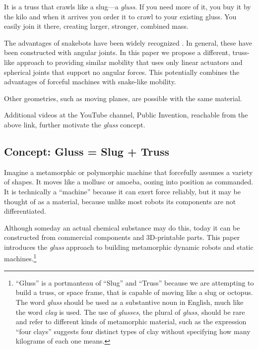 \documentclass[11pt]{article}
\begin{document}
It is a truss that crawls like a slug---a \emph{gluss}.
If you need more of it, you buy it by the kilo and when it arrives you order it
to crawl to your existing gluss. You easily join it there, creating 
larger, stronger, combined mass.

The advantages of snakebots have been widely recognized \cite{liljebäck2012snake}. In general, these have been constructed
with angular joints. In this paper we propose a different, truss-like approach to providing similar
mobility that uses only linear actuators and spherical joints that support no angular forces. This
potentially combines the advantages of forceful machines with snake-like mobility.

Other geometries, such as moving planes, are possible with the same material.

Additional videos at the YouTube channel, Public Invention, reachable from the above link,
further motivate the \emph{gluss} concept.


\subsection{Concept: Gluss = Slug + Truss}

Imagine a metamorphic or polymorphic machine that forcefully assumes a variety of shapes. It moves like a mollusc or amoeba,
oozing into position as commanded. It is technically a ``machine'' because it can exert force reliably, but
it may be thought of as a material, because unlike most robots its components are not differentiated.

Although someday an actual chemical substance may do this, today it can be constructed from commercial components
and 3D-printable parts. This paper introduces the \emph{gluss} approach to building metamorphic dynamic robots
and static machines.\footnote{ ``Gluss'' is a portmanteau of ``Slug'' and ``Truss'' because we are attempting to
build a truss, or space frame, that is capable of moving like a slug or octopus.
The word \textit{gluss}
should be used as a substantive noun in English, much like the word \textit{clay} is used.
The use of \textit{glusses}, the plural
of \textit{gluss}, should be rare and refer to different kinds of metamorphic material, such as the expression
``four clays'' suggests four distinct types of clay without specifying how many kilograms of each one means.}
\end{document}
